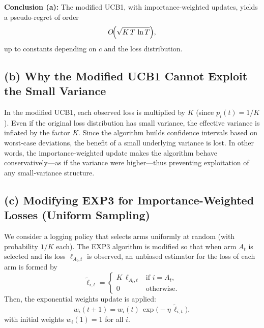 \medskip
\noindent
\textbf{Conclusion (a):}  
The modified UCB1, with importance-weighted updates, yields a pseudo-regret of order 
\[
  O\!\Bigl(\sqrt{K\,T\,\ln T}\Bigr),
\]
up to constants depending on \(c\) and the loss distribution.

\bigskip
\subsection*{(b) Why the Modified UCB1 Cannot Exploit the Small Variance}

In the modified UCB1, each observed loss is multiplied by \(K\) (since \(p_i(t)=1/K\)).  
Even if the original loss distribution has small variance, the effective variance is inflated by the factor \(K\).  
Since the algorithm builds confidence intervals based on worst-case deviations, the benefit of a small underlying variance is lost.  
In other words, the importance-weighted update makes the algorithm behave conservatively—as if the variance were higher—thus preventing exploitation of any small-variance structure.

\bigskip
\subsection*{(c) Modifying EXP3 for Importance-Weighted Losses (Uniform Sampling)}

We consider a logging policy that selects arms uniformly at random (with probability \(1/K\) each).  
The EXP3 algorithm is modified so that when arm \(A_t\) is selected and its loss \(\ell_{A_t,t}\) is observed, an unbiased estimator for the loss of each arm is formed by
\[
   \tilde{\ell}_{i,t}=
   \begin{cases}
     K\,\ell_{A_t,t} & \text{if } i=A_t,\\[1mm]
     0 & \text{otherwise.}
   \end{cases}
\]
Then, the exponential weights update is applied:
\[
   w_i(t+1)=w_i(t)\,\exp\bigl(-\eta\,\tilde{\ell}_{i,t}\bigr),
\]
with initial weights \(w_i(1)=1\) for all \(i\).

